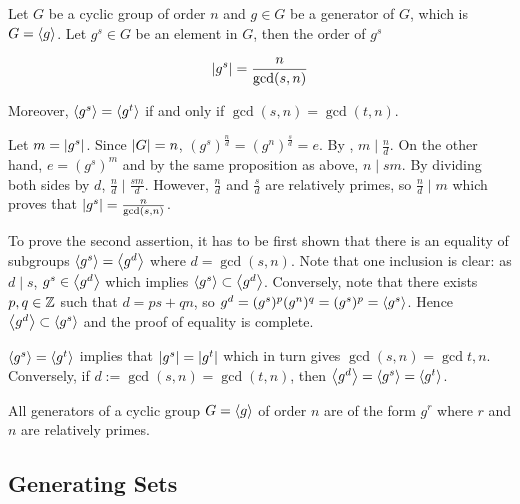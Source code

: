 \documentclass[a4paper,12pt]{article}
\begin{document}
\begin{pst}
  Let $G$ be a cyclic group of order $n$ and $g\in G$ be a generator of $G$, which is $G=\left\langle g\right\rangle$. Let $g^{s}\in G$ be an element in $G$, then the order of $g^{s}$

  $$\left| g^{s}\right|=\frac{n}{\gcd(s,n)}$$\s

  Moreover, $\left\langle g^{s}\right\rangle=\left\langle g^{t}\right\rangle$ if and only if $\gcd(s,n)=\gcd(t,n)$.\n

  \prf Let $m=\left| g^{s}\right|$. Since $\left| G\right|=n$, $(g^{s})^{\frac{n}{d}}=(g^{n})^{\frac{s}{d}}=e$. By \rpst[\sctr{26}], $m\mid\frac{n}{d}$. On the other hand, $e=(g^{s})^{m}$ and by the same proposition as above, $n\mid sm$. By dividing both sides by $d$, $\frac{n}{d}\mid\frac{sm}{d}$. However, $\frac{n}{d}$ and $\frac{s}{d}$ are relatively primes, so $\frac{n}{d}\mid{m}$ which proves that $\left| g^{s}\right|=\frac{n}{\gcd(s,n)}$.\n

  To prove the second assertion, it has to be first shown that there is an equality of subgroups $\left\langle g^{s}\right\rangle=\left\langle g^{d}\right\rangle$ where $d=\gcd(s,n)$. Note that one inclusion is clear: as $d\mid s$, $g^{s}\in \left\langle g^{d}\right\rangle$ which implies $\left\langle g^{s}\right\rangle\subset\left\langle g^{d}\right\rangle$. Conversely, note that there exists $p,q\in\mathbb{Z}$ such that $d=ps+qn$, so $g^{d}=(g^{s})^{p}(g^{n})^{q}=(g^{s})^{p}=\left\langle g^{s}\right\rangle$. Hence $\left\langle g^{d}\right\rangle\subset\left\langle g^{s}\right\rangle$ and the proof of equality is complete.\n

  $\left\langle g^{s}\right\rangle=\left\langle g^{t}\right\rangle$ implies that $\left| g^{s}\right|=\left| g^{t}\right|$ which in turn gives $\gcd(s,n)=\gcd{t,n}$. Conversely, if $d:=\gcd(s,n)=\gcd(t,n)$, then $\left\langle g^{d}\right\rangle=\left\langle g^{s}\right\rangle=\left\langle g^{t}\right\rangle$.
\end{pst}\n

\begin{crl}
  All generators of a cyclic group $G=\left\langle g\right\rangle$ of order $n$ are of the form $g^{r}$ where $r$ and $n$ are relatively primes.
\end{crl}

\subsection{Generating Sets}
\end{document}
